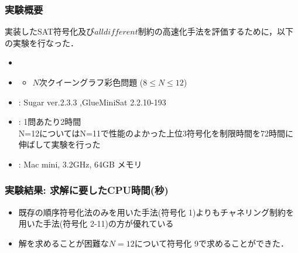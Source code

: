 \documentclass [dvipdfmx,11pt]{beamer}
\newcommand{\alldifferent}{$alldifferent$}
\begin{document}
\begin{frame}
    \frametitle{実験概要}
    実装したSAT符号化及び{\alldifferent}制約の高速化手法を評価するために，以下の実験を行なった．
    \begin{itemize}
        \item {}
        \item {}
            \begin{itemize}
                \item $N$次クイーングラフ彩色問題 ($8\leq N\leq 12$)
            \end{itemize}
        \item {}: Sugar ver.2.3.3 ,GlueMiniSat 2.2.10-193
        \item {}: 1問あたり2時間\\
            N=12についてはN=11で性能のよかった上位3符号化を制限時間を72時間に伸ばして実験を行った
        \item {}: Mac mini, 3.2GHz, 64GB メモリ
    \end{itemize}
\end{frame}



\begin{frame}
    \frametitle{実験結果: 求解に要したCPU時間(秒)}
    \begin{block}{}\centering
        {\tiny }
    \end{block}
    \begin{itemize}
        \item 既存の順序符号化法のみを用いた手法(符号化 1)よりもチャネリング制約を用いた手法(符号化 2-11)の方が優れている
        \item 解を求めることが困難な$N=12$について符号化 9で求めることができた．
    \end{itemize}
\end{frame}
\end{document}
